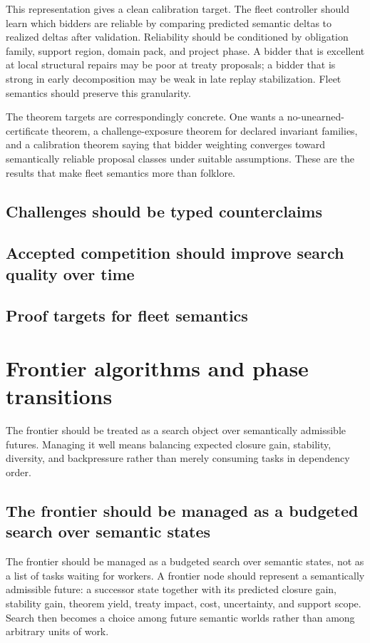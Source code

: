 \documentclass[11pt]{report}
\begin{document}
This representation gives a clean calibration target. The fleet controller should learn which bidders are reliable by comparing predicted semantic deltas to realized deltas after validation. Reliability should be conditioned by obligation family, support region, domain pack, and project phase. A bidder that is excellent at local structural repairs may be poor at treaty proposals; a bidder that is strong in early decomposition may be weak in late replay stabilization. Fleet semantics should preserve this granularity.

The theorem targets are correspondingly concrete. One wants a no-unearned-certificate theorem, a challenge-exposure theorem for declared invariant families, and a calibration theorem saying that bidder weighting converges toward semantically reliable proposal classes under suitable assumptions. These are the results that make fleet semantics more than folklore.
\section{Challenges should be typed counterclaims}
\section{Accepted competition should improve search quality over time}
\section{Proof targets for fleet semantics}
\chapter{Frontier algorithms and phase transitions}
\noindent The frontier should be treated as a search object over semantically admissible futures. Managing it well means balancing expected closure gain, stability, diversity, and backpressure rather than merely consuming tasks in dependency order.
\section{The frontier should be managed as a budgeted search over semantic states}
The frontier should be managed as a budgeted search over semantic states, not as a list of tasks waiting for workers. A frontier node should represent a semantically admissible future: a successor state together with its predicted closure gain, stability gain, theorem yield, treaty impact, cost, uncertainty, and support scope. Search then becomes a choice among future semantic worlds rather than among arbitrary units of work.
\end{document}

